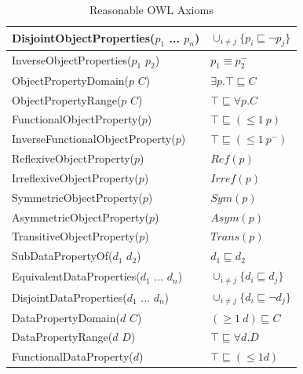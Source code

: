 \begin{table}[ht]
{\begin{tabular}{|l|l|}
DisjointObjectProperties($p_1$ ... $p_n$)          & $\cup_{i \neq j} \{p_i \sqsubseteq \neg p_j\}$                             \\ \hline
InverseObjectProperties($p_1$ $p_2$)               & $p_1 \equiv p_2^-$                                                  \\ \hline
ObjectPropertyDomain($p$ $C$)                    & $\exists p.\top \sqsubseteq C$                                       \\ \hline
ObjectPropertyRange($p$ $C$)                     & $\top \sqsubseteq \forall p.C$                                       \\ \hline
FunctionalObjectProperty($p$)                  & $\top \sqsubseteq (\leq 1 \>p)$                                        \\ \hline
InverseFunctionalObjectProperty($p$)           & $\top \sqsubseteq (\leq 1 \>p^-)$                                       \\ \hline
ReflexiveObjectProperty($p$)                   & $Ref(p)$                                                        \\ \hline
IrreflexiveObjectProperty($p$)                 & $Irref(p)$                                                      \\ \hline
SymmetricObjectProperty($p$)                   & $Sym(p)$                                                        \\ \hline
AsymmetricObjectProperty($p$)                  & $Asym(p)$                                                       \\ \hline
TransitiveObjectProperty($p$)                  & $Trans(p)$                                                      \\ \hline
SubDataPropertyOf($d_1$ $d_2$)                     & $d_1 \sqsubseteq d_2$                                              \\ \hline
EquivalentDataProperties($d_1$ ... $d_n$)          & $\cup_{i \neq j} \{d_i \sqsubseteq d_j\}$                                 \\ \hline
DisjointDataProperties($d_1$ ... $d_n$)            & $\cup_{i \neq j} \{d_i \sqsubseteq \neg d_j\}$                             \\ \hline
DataPropertyDomain($d$ $C$)                      & $(\geq 1 \>d) \sqsubseteq C$                                        \\ \hline
DataPropertyRange($d$ $D$)                       & $\top \sqsubseteq \forall d.D$                                       \\ \hline
FunctionalDataProperty($d$)                    & $\top \sqsubseteq (\leq 1 d)$                                        \\ \hline
\end{tabular}%
}
\caption{Reasonable OWL Axioms}
\label{tab:OWL_AXIOM}
\end{table}

